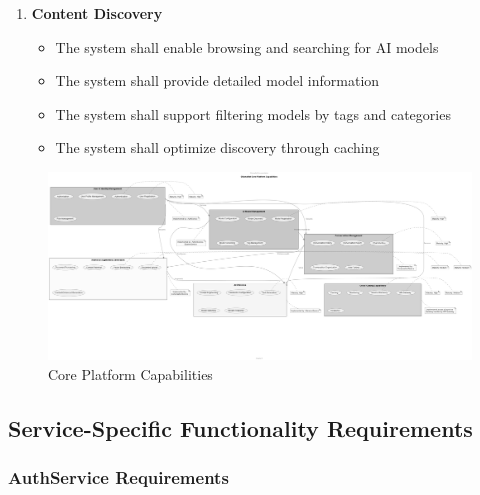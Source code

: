 \begin{enumerate}
   \item \textbf{Content Discovery}
   \begin{itemize}
      \item The system shall enable browsing and searching for AI models
      \item The system shall provide detailed model information
      \item The system shall support filtering models by tags and categories
      \item The system shall optimize discovery through caching
   \end{itemize}
\end{enumerate}

\begin{figure}[p]
    \centering
    \includegraphics[width=\textwidth]{./Chapter03/figures/Core_Platform_Capabilities.png}
    \caption{Core Platform Capabilities}
    \label{fig:platform-capabilities}
\end{figure}
\clearpage

\subsection{Service-Specific Functionality Requirements}

\subsubsection*{AuthService Requirements}

